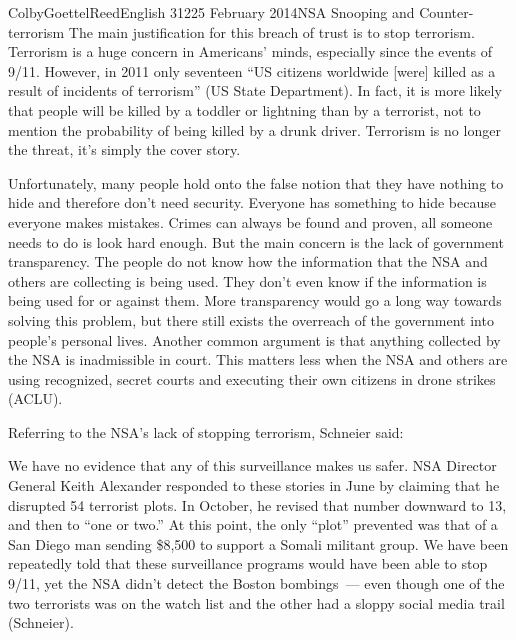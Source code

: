\documentclass[12pt]{article}
\begin{document}
\begin{mla}{Colby}{Goettel}{Reed}{English 312}{25 February 2014}{NSA Snooping and Counter-terrorism}
The main justification for this breach of trust is to stop terrorism. Terrorism is a huge concern in Americans' minds, especially since the events of 9/11. However, in 2011 only seventeen ``US citizens worldwide [were] killed as a result of incidents of terrorism'' (US State Department). In fact, it is more likely that people will be killed by a toddler or lightning than by a terrorist, not to mention the probability of being killed by a drunk driver. Terrorism is no longer the threat, it's simply the cover story.

Unfortunately, many people hold onto the false notion that they have nothing to hide and therefore don't need security. Everyone has something to hide because everyone makes mistakes. Crimes can always be found and proven, all someone needs to do is look hard enough. But the main concern is the lack of government transparency. The people do not know how the information that the NSA and others are collecting is being used. They don't even know if the information is being used for or against them. More transparency would go a long way towards solving this problem, but there still exists the overreach of the government into people's personal lives. Another common argument is that anything collected by the NSA is inadmissible in court. This matters less when the NSA and others are using recognized, secret courts and executing their own citizens in drone strikes (ACLU).

Referring to the NSA's lack of stopping terrorism, Schneier said:
\begin{mlaquote}
We have no evidence that any of this surveillance makes us safer. NSA Director General Keith Alexander responded to these stories in June by claiming that he disrupted 54 terrorist plots. In October, he revised that number downward to 13, and then to ``one or two.'' At this point, the only ``plot'' prevented was that of a San Diego man sending \$8,500 to support a Somali militant group. We have been repeatedly told that these surveillance programs would have been able to stop 9/11, yet the NSA didn't detect the Boston bombings~--- even though one of the two terrorists was on the watch list and the other had a sloppy social media trail (Schneier).
\end{mlaquote}



\end{mla}
\end{document}

